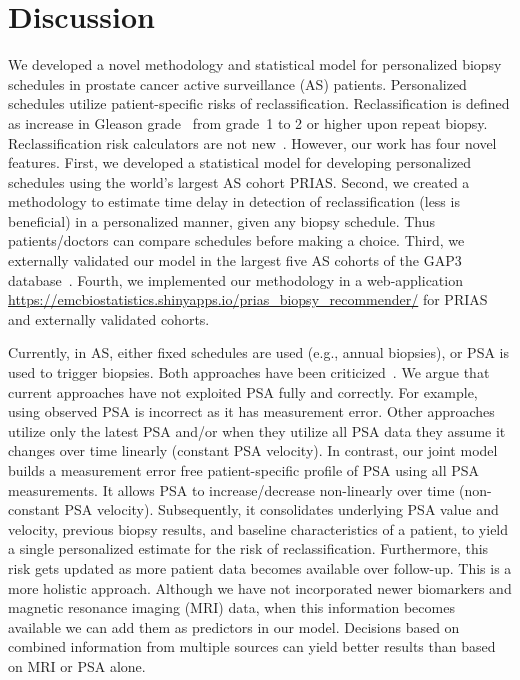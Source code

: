 \section{Discussion}
We developed a novel methodology and statistical model for personalized biopsy schedules in prostate cancer active surveillance (AS) patients. Personalized schedules utilize patient-specific risks of reclassification. Reclassification is defined as increase in Gleason grade~\citep{epsteinGG2014} from grade~1 to 2 or higher upon repeat biopsy. Reclassification risk calculators are not new~\citep{coley2017prediction,ankerst2015precision}. However, our work has four novel features. First, we developed a statistical model for developing personalized schedules using the world's largest AS cohort PRIAS. Second, we created a methodology to estimate time delay in detection of reclassification (less is beneficial) in a personalized manner, given any biopsy schedule. Thus patients/doctors can compare schedules before making a choice. Third, we externally validated our model in the largest five AS cohorts of the GAP3 database~\citep{gap3_2018}. Fourth, we implemented our methodology in a web-application \url{https://emcbiostatistics.shinyapps.io/prias_biopsy_recommender/} for PRIAS and externally validated cohorts.

Currently, in AS, either fixed schedules are used (e.g., annual biopsies), or PSA is used to trigger biopsies. Both approaches have been criticized~\citep{vickers2009psavelocity,bokhorst2015compliance}. We argue that current approaches have not exploited PSA fully and correctly. For example, using observed PSA is incorrect as it has measurement error. Other approaches utilize only the latest PSA and/or when they utilize all PSA data they assume it changes over time linearly (constant PSA velocity). In contrast, our joint model builds a measurement error free patient-specific profile of PSA using all PSA measurements. It allows PSA to increase/decrease non-linearly over time (non-constant PSA velocity). Subsequently, it consolidates underlying PSA value and velocity, previous biopsy results, and baseline characteristics of a patient, to yield a single personalized estimate for the risk of reclassification. Furthermore, this risk gets updated as more patient data becomes available over follow-up. This is a more holistic approach. Although we have not incorporated newer biomarkers and magnetic resonance imaging (MRI) data, when this information becomes available we can add them as predictors in our model. Decisions based on combined information from multiple sources can yield better results than based on MRI or PSA alone. 

